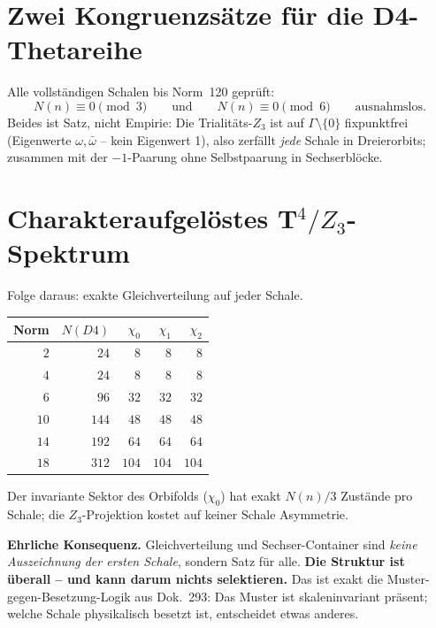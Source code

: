 \section{Zwei Kongruenzsätze für die D4-Thetareihe}

Alle vollständigen Schalen bis Norm~120 geprüft:
\begin{equation}
  N(n) \equiv 0 \pmod 3
  \qquad\text{und}\qquad
  N(n) \equiv 0 \pmod 6
  \qquad\text{ausnahmslos.}
\end{equation}
Beides ist Satz, nicht Empirie: Die Trialitäts-$Z_3$ ist auf
$\Gamma\setminus\{0\}$ fixpunktfrei (Eigenwerte $\omega,\bar\omega$
-- kein Eigenwert 1), also zerfällt \emph{jede} Schale in
Dreierorbits; zusammen mit der $-1$-Paarung ohne Selbstpaarung in
Sechserblöcke.

\section{Charakteraufgelöstes T$^4/Z_3$-Spektrum}

Folge daraus: exakte Gleichverteilung auf jeder Schale.

\begin{center}
\begin{tabular}{rrrrr}
\toprule
Norm & $N(D4)$ & $\chi_0$ & $\chi_1$ & $\chi_2$ \\
\midrule
$2$ & $24$ & $8$ & $8$ & $8$ \\
$4$ & $24$ & $8$ & $8$ & $8$ \\
$6$ & $96$ & $32$ & $32$ & $32$ \\
$10$ & $144$ & $48$ & $48$ & $48$ \\
$14$ & $192$ & $64$ & $64$ & $64$ \\
$18$ & $312$ & $104$ & $104$ & $104$ \\
\bottomrule
\end{tabular}
\end{center}

Der invariante Sektor des Orbifolds ($\chi_0$) hat exakt $N(n)/3$
Zustände pro Schale; die $Z_3$-Projektion kostet auf keiner Schale
Asymmetrie.

\textbf{Ehrliche Konsequenz.} Gleichverteilung und Sechser-Container
sind \emph{keine Auszeichnung der ersten Schale}, sondern Satz für
alle. \textbf{Die Struktur ist überall -- und kann darum nichts
selektieren.} Das ist exakt die Muster-gegen-Besetzung-Logik aus
Dok.~293: Das Muster ist skaleninvariant präsent; welche Schale
physikalisch besetzt ist, entscheidet etwas anderes.

